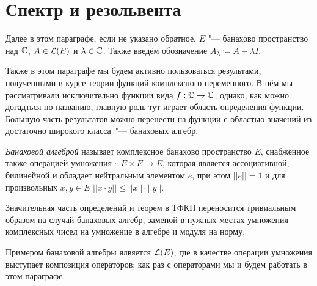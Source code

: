 \documentclass[main]{subfiles}
\begin{document}
\section{Спектр и резольвента} %
%

Далее в этом параграфе,
если не указано обратное,
\( E \) "--- банахово пространство над \( \mathbb{C} \),
\( A \in \Linears{E} \) и \( \lambda \in \mathbb{C} \).
Также введём обозначение \( A_\lambda \coloneqq A - \lambda I \).

Также в этом параграфе мы будем активно
пользоваться результами,
полученными в курсе
теории функций комплексного переменного.
В нём мы рассматривали
исключительно функции
вида \( f : \mathbb{C} \to \mathbb{C} \);
однако, как можно догадться по названию,
главную роль тут играет область определения функции.
Большую часть результатов можно перенести
на функции с областью значений из достаточно
широкого класса~"--- банаховых алгебр.

\begin{definition}
  \emph{Банаховой алгеброй}
  называет комплексное банахово пространство \( E \),
  снабжённое также операцией умножения
  \( \cdot : E \times E \to E \),
  которая является 
  ассоциативной, билинейной и
  обладает нейтральным элементом \( e \),
  при этом \( ||e|| = 1 \)
  и для произвольных \( x, y \in E \)
  \( ||x \cdot y|| \le ||x|| \cdot ||y|| \).
\end{definition}

Значительная часть определений и теорем в ТФКП
переносится тривиальным образом на случай
банаховых алгебр, заменой в нужных местах
умножения комплексных чисел на умножение в алгебре
и модуля на норму.

Примером банаховой алгебры ялвяется
\( \Linears{E} \), где в качестве операции
умножения выступает композиция операторов;
как раз с операторами мы и будем работать в этом параграфе.

%
\end{document}
